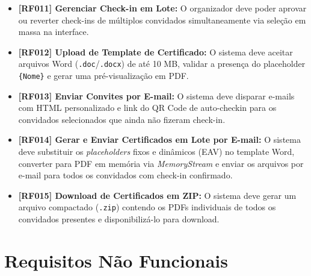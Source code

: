 \begin{itemize}
    \item \textbf{[RF011] Gerenciar Check-in em Lote:} O organizador deve poder aprovar ou reverter check-ins de múltiplos convidados simultaneamente via seleção em massa na interface.
    \item \textbf{[RF012] Upload de Template de Certificado:} O sistema deve aceitar arquivos Word (\texttt{.doc}/\texttt{.docx}) de até 10 MB, validar a presença do placeholder \texttt{\{Nome\}} e gerar uma pré-visualização em PDF.
    \item \textbf{[RF013] Enviar Convites por E-mail:} O sistema deve disparar e-mails com HTML personalizado e link do QR Code de auto-checkin para os convidados selecionados que ainda não fizeram check-in.
    \item \textbf{[RF014] Gerar e Enviar Certificados em Lote por E-mail:} O sistema deve substituir os \textit{placeholders} fixos e dinâmicos (EAV) no template Word, converter para PDF em memória via \textit{MemoryStream} e enviar os arquivos por e-mail para todos os convidados com check-in confirmado.
    \item \textbf{[RF015] Download de Certificados em ZIP:} O sistema deve gerar um arquivo compactado (\texttt{.zip}) contendo os PDFs individuais de todos os convidados presentes e disponibilizá-lo para download.
\end{itemize}

\section{Requisitos Não Funcionais}

